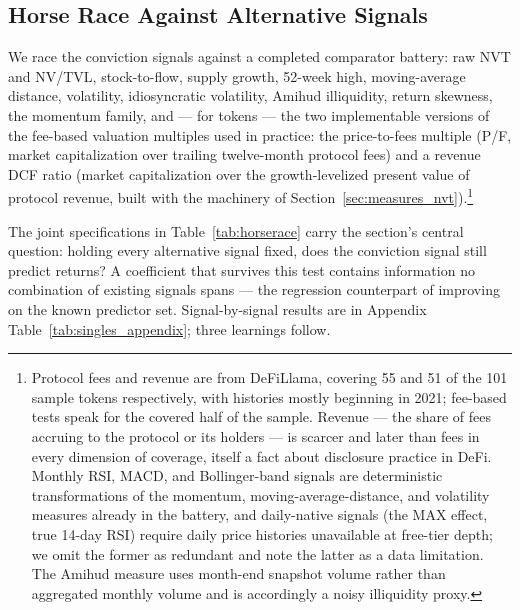 \documentclass[12pt]{article}
\begin{document}
\FloatBarrier
\subsection{Horse Race Against Alternative Signals}
\label{sec:results_horserace}

We race the conviction signals against a completed comparator battery: raw NVT and
NV/TVL, stock-to-flow, supply growth, 52-week high, moving-average distance,
volatility, idiosyncratic volatility, Amihud illiquidity, return skewness, the momentum
family, and --- for tokens --- the two implementable versions of the fee-based valuation
multiples used in practice: the price-to-fees multiple (P/F, market
capitalization over trailing twelve-month protocol fees) and a revenue DCF ratio
(market capitalization over the growth-levelized present value of protocol revenue,
built with the machinery of Section~\ref{sec:measures_nvt}).\footnote{Protocol fees and
revenue are from DeFiLlama, covering 55 and 51 of the 101 sample tokens respectively,
with histories mostly beginning in 2021; fee-based tests speak for the covered half of
the sample. Revenue --- the share of fees accruing to the protocol or its holders ---
is scarcer and later than fees in every dimension of coverage, itself a fact about
disclosure practice in DeFi. Monthly RSI, MACD, and Bollinger-band signals are
deterministic transformations of the momentum, moving-average-distance, and volatility
measures already in the battery, and daily-native signals (the MAX effect, true 14-day
RSI) require daily price histories unavailable at free-tier depth; we omit the former
as redundant and note the latter as a data limitation. The Amihud measure uses
month-end snapshot volume rather than aggregated monthly volume and is accordingly a
noisy illiquidity proxy.}

The joint specifications in Table~\ref{tab:horserace} carry the section's central
question: holding every alternative signal fixed, does the conviction signal still
predict returns? A coefficient that survives this test contains information no
combination of existing signals spans --- the regression counterpart of improving on
the known predictor set. Signal-by-signal results are in Appendix
Table~\ref{tab:singles_appendix}; three learnings follow.
\end{document}
